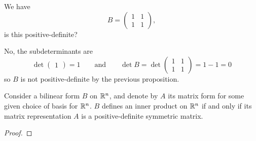\documentclass[10pt, a4paper]{article}
\begin{document}
\begin{example}
    We have
    \[
    B = \begin{pmatrix}
        1 & 1 \\
        1 & 1
    \end{pmatrix},
    \]
    is this positive-definite?

    \begin{solution}
        No,
        the subdeterminants are
        \[
        \det\begin{pmatrix}
            1
        \end{pmatrix} = 1\qquad\text{and}\qquad\det{B} = \det\begin{pmatrix}
            1 & 1 \\ 1 & 1
        \end{pmatrix} = 1 - 1 = 0
        \]
        so $B$ is not positive-definite by the previous proposition.
    \end{solution}
\end{example}

\begin{proposition}
    Consider a bilinear form $B$ on $\mathbb{R} ^ n$,
    and denote by $A$ its matrix form for some given choice of basis for $\mathbb{R} ^ n$.
    $B$ defines an inner product on $\mathbb{R} ^ n$ if and only if its matrix representation $A$ is a positive-definite symmetric matrix.

    \begin{proof}
        
    \end{proof}
\end{proposition}
\end{document}
